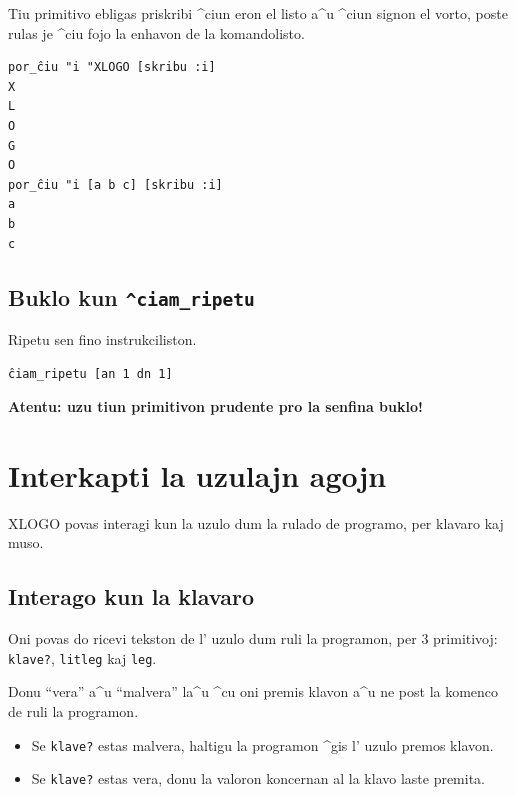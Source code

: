 
Tiu primitivo ebligas priskribi ^ciun eron el listo a^u ^ciun signon
el vorto, poste rulas je ^ciu fojo la enhavon de la komandolisto.

\begin{verbatim}
por_ĉiu "i "XLOGO [skribu :i]
X
L
O
G
O
por_ĉiu "i [a b c] [skribu :i]
a
b
c
\end{verbatim}

\subsection{Buklo kun \texttt{^ciam\_ripetu}}


Ripetu sen fino instrukciliston.

\begin{verbatim}
ĉiam_ripetu [an 1 dn 1]
\end{verbatim}

\textbf{Atentu: uzu tiun primitivon prudente pro la senfina buklo!}

\section{Interkapti la uzulajn agojn}

XLOGO povas interagi kun la uzulo dum la rulado de programo, per
klavaro kaj muso.

\subsection{Interago kun la klavaro}

Oni povas do ricevi tekston de l' uzulo dum ruli la programon, per $3$
primitivoj: \texttt{klave?}, \texttt{litleg} kaj \texttt{leg}.


Donu ``vera'' a^u ``malvera'' la^u ^cu oni premis klavon a^u ne post
la komenco de ruli la programon.


\begin{itemize}
\item Se \texttt{klave?} estas malvera, haltigu la programon ^gis l'
  uzulo premos klavon.
\item Se \texttt{klave?} estas vera, donu la valoron koncernan al la klavo
  laste premita.
\end{itemize}

